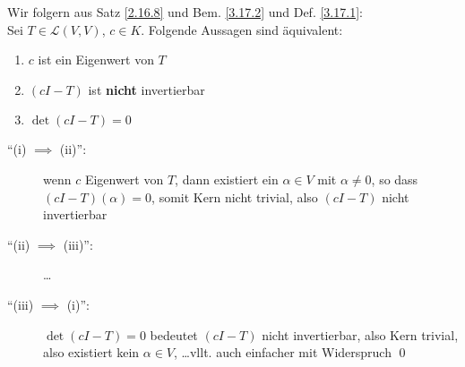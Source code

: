 \begin{subtheorem}
	Wir folgern aus Satz \ref{2.16.8} und Bem. \ref{3.17.2} und Def. \ref{3.17.1}:\\
	Sei $ T \in \mathcal{L} (V, V) $, $ c \in K $.
	Folgende Aussagen sind äquivalent:
	\begin{enumerate}[label=(\roman*)]
		\item $ c $ ist ein Eigenwert von $ T $ 
		\item $ \left( cI - T \right)  $ ist \textbf{nicht} invertierbar
		\item $ \det\left( cI - T \right) = 0 $
	\end{enumerate}
\end{subtheorem}
\begin{subproof*}
	\begin{description}
		\item[``(i) $ \implies  $ (ii)'':] wenn $ c $ Eigenwert von $ T $, dann existiert ein $ \alpha \in V $ mit $ \alpha \neq 0 $, so dass $ \left( cI - T \right) (\alpha) = 0 $, somit Kern nicht trivial, also $ \left( cI - T \right)  $ nicht invertierbar
		\item[``(ii) $ \implies  $ (iii)'':] \ldots
		\item[``(iii) $ \implies  $ (i)'':] $ \det\left( cI - T \right) = 0 $ bedeutet $ ( cI - T) $ nicht invertierbar, also Kern trivial, also existiert kein $ \alpha \in V $, \ldots vllt. auch einfacher mit Widerspruch \qed
	\end{description}
\end{subproof*}


